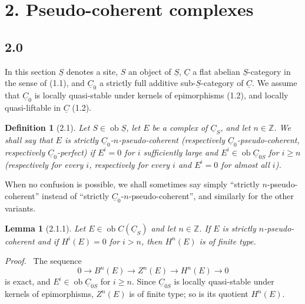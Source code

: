 \documentclass[13pt]{extarticle}
\newcommand{\ZZ}{\mathbb Z}
\newcommand{\uS}{\underline S}
\newcommand{\uC}{\underline C}
\newcommand{\ob}{\operatorname{ob}}
\newenvironment{prooftext}[1][Proof]{\par\noindent\emph{#1.}\ }{\par\medskip}
\newtheorem*{lemma*}{Lemma}
\newtheorem*{definition*}{Definition}
\begin{document}
\section*{2. Pseudo-coherent complexes}

\subsection*{2.0}
In this section $\uS$ denotes a site, $S$ an object of $\uS$, $\uC$ a flat abelian $\uS$-category in the sense of (1.1), and $\uC_0$ a strictly full additive sub-$\uS$-category of $\uC$. We assume that $\uC_0$ is locally quasi-stable under kernels of epimorphisms (1.2), and locally quasi-liftable in $\uC$ (1.2).

\begin{definition*}[2.1]
Let $S\in\ob\uS$, let $E$ be a complex of $\uC_S$, and let $n\in\ZZ$. We shall say that $E$ is \emph{strictly $\uC_0$-$n$-pseudo-coherent} (respectively $\uC_0$-pseudo-coherent, respectively $\uC_0$-perfect) if $E^i=0$ for $i$ sufficiently large and $E^i\in\ob\uC_{0S}$ for $i\geq n$ (respectively for every $i$, respectively for every $i$ and $E^i=0$ for almost all $i$).
\end{definition*}

When no confusion is possible, we shall sometimes say simply ``strictly $n$-pseudo-coherent'' instead of ``strictly $\uC_0$-$n$-pseudo-coherent'', and similarly for the other variants.

\begin{lemma*}[2.1.1]
Let $E\in\ob C(\uC_S)$ and let $n\in\ZZ$. If $E$ is strictly $n$-pseudo-coherent and if $H^i(E)=0$ for $i>n$, then $H^n(E)$ is of finite type.
\end{lemma*}

\begin{prooftext}
The sequence
\[
0\longrightarrow B^n(E)\longrightarrow Z^n(E)\longrightarrow H^n(E)\longrightarrow0
\]
is exact, and $E^i\in\ob\uC_{0S}$ for $i\geq n$. Since $\uC_{0S}$ is locally quasi-stable under kernels of epimorphisms, $Z^n(E)$ is of finite type; so is its quotient $H^n(E)$.
\end{prooftext}
\end{document}
